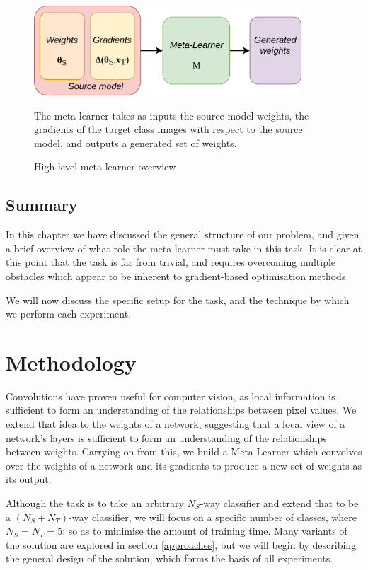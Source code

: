 \documentclass{report}
\begin{document}
\begin{figure}[!h]
 \centering
 \includegraphics[width=10cm]{ml-highlevel-overview}
 \caption{High-level meta-learner overview}
 The meta-learner takes as inputs the source model weights, the gradients of the target class images with respect to the source model, and outputs a generated set of weights.
 \label{fig:metalearnersimple:1}
\end{figure}

\section{Summary}
In this chapter we have discussed the general structure of our problem, and given a brief overview of what role the meta-learner must take in this task. It is clear at this point that the task is far from trivial, and requires overcoming multiple obstacles which appear to be inherent to gradient-based optimisation methods. \par
We will now discuss the specific setup for the task, and the technique by which we perform each experiment. \\


\chapter{Methodology} \label{methodology}
Convolutions have proven useful for computer vision, as local information is sufficient to form an understanding of the relationships between pixel values. We extend that idea to the weights of a network, suggesting that a local view of a network's layers is sufficient to form an understanding of the relationships between weights. Carrying on from this, we build a Meta-Learner which convolves over the weights of a network and its gradients to produce a new set of weights as its output. \par
Although the task is to take an arbitrary $N_{S}$-way classifier and extend that to be a $(N_{S}+N_{T})$-way classifier, we will focus on a specific number of classes, where $N_{S} = N_{T} = 5$; so as to minimise the amount of training time. Many variants of the solution are explored in section \ref{approaches}, but we will begin by describing the general design of the solution, which forms the basis of all experiments. \par
\end{document}
